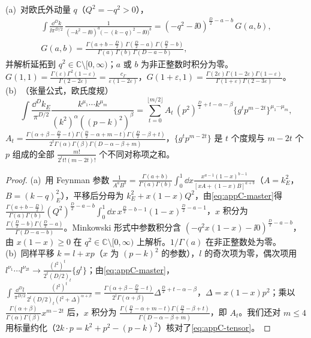 \begin{lemma}[单圈两点函数]\label{lem:appC-bubble}
(a)~对欧氏外动量 $q$（$Q^2=-q^2>0$），
\begin{equation}\label{eq:appC-bubble}
\begin{gathered}
\int\frac{\dd^Dk}{\ii\pi^{D/2}}\,\frac{1}{(-k^2-\ii0)^a\big(-(k-q)^2-\ii0\big)^b}=(-q^2-\ii0)^{\frac D2-a-b}\,G(a,b),\\
G(a,b)=\frac{\Gamma(a+b-\frac D2)\,\Gamma(\frac D2-a)\,\Gamma(\frac D2-b)}{\Gamma(a)\,\Gamma(b)\,\Gamma(D-a-b)},
\end{gathered}
\end{equation}
并解析延拓到 $q^2\in\mathbb C\setminus[0,\infty)$；$a$ 或 $b$ 为非正整数时积分为零。$G(1,1)=\frac{\Gamma(\varepsilon)\Gamma^2(1-\varepsilon)}{\Gamma(2-2\varepsilon)}=\frac{c_\Gamma}{\varepsilon(1-2\varepsilon)}$，$G(1+\varepsilon,1)=\frac{\Gamma(2\varepsilon)\Gamma(1-2\varepsilon)\Gamma(1-\varepsilon)}{\Gamma(1+\varepsilon)\Gamma(2-3\varepsilon)}$。
(b)~（张量公式，欧氏度规）
\begin{equation}\label{eq:appC-tensor}
\int\frac{\dd^Dk_E}{\pi^{D/2}}\frac{k^{\mu_1}\cdots k^{\mu_m}}{(k^2)^\alpha((p-k)^2)^\beta}=\sum_{t=0}^{\lfloor m/2\rfloor}A_t\,(p^2)^{\frac D2+t-\alpha-\beta}\{g^tp^{m-2t}\}^{\mu_1\cdots\mu_m},
\end{equation}
$A_t=\frac{\Gamma(\alpha+\beta-\frac D2-t)\Gamma(\frac D2-\alpha+m-t)\Gamma(\frac D2-\beta+t)}{2^t\Gamma(\alpha)\Gamma(\beta)\Gamma(D-\alpha-\beta+m)}$，$\{g^tp^{m-2t}\}$ 是 $t$ 个度规与 $m-2t$ 个 $p$ 组成的全部 $\frac{m!}{2^tt!(m-2t)!}$ 个不同对称项之和。
\end{lemma}
\begin{proof}
(a)~用 Feynman 参数 $\frac1{A^aB^b}=\frac{\Gamma(a+b)}{\Gamma(a)\Gamma(b)}\int_0^1\dd x\frac{x^{a-1}(1-x)^{b-1}}{[xA+(1-x)B]^{a+b}}$（$A=k_E^2$，$B=(k-q)_E^2$），平移后分母为 $k_E^2+x(1-x)Q^2$，由\cref{eq:appC-master}得 $\frac{\Gamma(a+b-\frac D2)}{\Gamma(a)\Gamma(b)}(Q^2)^{\frac D2-a-b}\int_0^1\dd x\,x^{\frac D2-b-1}(1-x)^{\frac D2-a-1}$，$x$ 积分为 $\frac{\Gamma(\frac D2-b)\Gamma(\frac D2-a)}{\Gamma(D-a-b)}$。Minkowski 形式中参数积分含 $(-q^2x(1-x)-\ii0)^{\frac D2-a-b}$，由 $x(1-x)\ge0$ 在 $q^2\in\mathbb C\setminus[0,\infty)$ 上解析。$1/\Gamma(a)$ 在非正整数处为零。
(b)~同样平移 $k=l+xp$（$x$ 为 $(p-k)^2$ 的参数），$l$ 的奇次项为零，偶次项用 $l^{\nu_1}\cdots l^{\nu_{2t}}\to\frac{(l^2)^t}{2^t(D/2)_t}\{g^t\}$；由\cref{eq:appC-master}，$\int\frac{\dd^Dl}{\pi^{D/2}}\frac{(l^2)^t}{2^t(D/2)_t(l^2+\Delta)^{\alpha+\beta}}=\frac{\Gamma(\alpha+\beta-\frac D2-t)}{2^t\Gamma(\alpha+\beta)}\Delta^{\frac D2+t-\alpha-\beta}$，$\Delta=x(1-x)p^2$；乘以 $\frac{\Gamma(\alpha+\beta)}{\Gamma(\alpha)\Gamma(\beta)}x^{m-2t}$ 后，$x$ 积分为 $\frac{\Gamma(\frac D2-\alpha+m-t)\Gamma(\frac D2-\beta+t)}{\Gamma(D-\alpha-\beta+m)}$，即 $A_t$。我们还对 $m\le4$ 用标量约化（$2k\cdot p=k^2+p^2-(p-k)^2$）核对了\cref{eq:appC-tensor}。
\end{proof}

